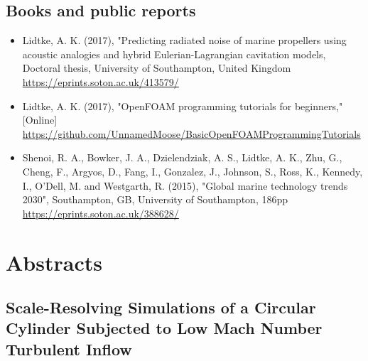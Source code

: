 \documentclass[a4paper,10pt]{article}
\begin{document}
\subsection{Books and public reports}
%
\begin{itemize}
\item Lidtke, A. K. (2017), "Predicting radiated noise of marine propellers using acoustic analogies and hybrid Eulerian-Lagrangian cavitation models,
	Doctoral thesis, University of Southampton, United Kingdom
	\cite{Lidtke2017d}
	\\ \url{https://eprints.soton.ac.uk/413579/}
%
\item Lidtke, A. K. (2017), "OpenFOAM programming tutorials for beginners," [Online]
	\cite{Lidtke2017c}
	\\ \url{https://github.com/UnnamedMoose/BasicOpenFOAMProgrammingTutorials}
%
\item Shenoi, R. A., Bowker, J. A., Dzielendziak, A. S., Lidtke, A. K., Zhu, G., Cheng, F.,
	Argyos, D., Fang, I., Gonzalez, J., Johnson, S., Ross, K., Kennedy, I., O'Dell, M.
	and Westgarth, R. (2015), "Global marine technology trends 2030", Southampton, GB,
	University of Southampton, 186pp
	\cite{Shenoi2015}
	\\ \url{https://eprints.soton.ac.uk/388628/}
%
\end{itemize}

\newpage

\section{Abstracts}

\subsection{Scale-Resolving Simulations of a Circular Cylinder Subjected to Low Mach Number Turbulent Inflow \cite{Lidtke2021b}}
\end{document}
